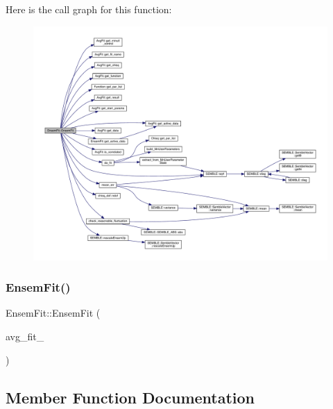 Here is the call graph for this function\+:
\nopagebreak
\begin{figure}[H]
\begin{center}
\leavevmode
\includegraphics[width=350pt]{dc/dae/classEnsemFit_ae8fc27d065976ce4b2a357b457e7755d_cgraph}
\end{center}
\end{figure}
\mbox{\label{classEnsemFit_ae8fc27d065976ce4b2a357b457e7755d}} 
\subsubsection{\texorpdfstring{EnsemFit()}{EnsemFit()}\hspace{0.1cm}{\footnotesize\ttfamily [2/2]}}
{\footnotesize\ttfamily Ensem\+Fit\+::\+Ensem\+Fit (\begin{DoxyParamCaption}\item[{const \mbox{\hyperlink{classAvgFit}{Avg\+Fit}} \&}]{avg\+\_\+fit\+\_\+ }\end{DoxyParamCaption})}



\subsection{Member Function Documentation}
\mbox{\label{classEnsemFit_a562d0418f52bf3491752e53a1f65f13b}} 
